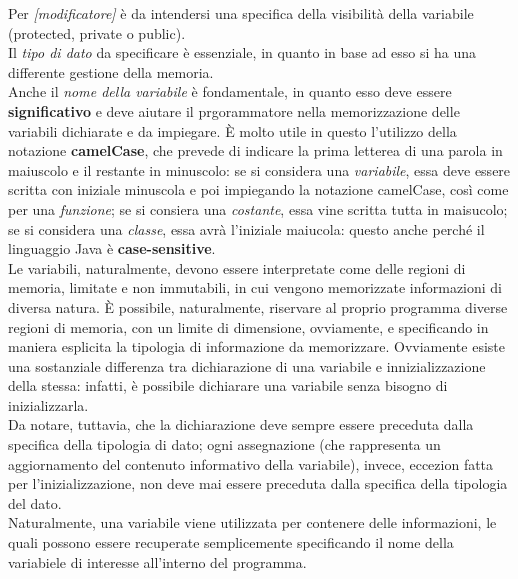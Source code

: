 \documentclass[a4paper]{extarticle}
\begin{document}
\noindent
Per \emph{[modificatore]} è da intendersi una specifica della visibilità della variabile (protected, private o public).\\
Il \emph{tipo di dato} da specificare è essenziale, in quanto in base ad esso si ha una differente gestione della memoria.\\
Anche il \emph{nome della variabile} è fondamentale, in quanto esso deve essere \textbf{significativo} e deve aiutare il prgorammatore nella memorizzazione delle variabili dichiarate e da impiegare. È molto utile in questo l'utilizzo della notazione \textbf{camelCase}, che prevede di indicare la prima letterea di una parola in maiuscolo e il restante in minuscolo:
se si considera una \emph{variabile}, essa deve essere scritta con iniziale minuscola e poi impiegando la notazione camelCase, così come per una \emph{funzione}; se si consiera una \emph{costante}, essa vine scritta tutta in maisucolo; se si considera una \emph{classe}, essa avrà l'iniziale maiucola: questo anche perché il linguaggio Java è \textbf{case-sensitive}.\\
Le variabili, naturalmente, devono essere interpretate come delle regioni di memoria, limitate e non immutabili, in cui vengono memorizzate informazioni di diversa natura. È possibile, naturalmente, riservare al proprio programma diverse regioni di memoria, con un limite di dimensione, ovviamente, e specificando in maniera esplicita la tipologia di informazione da memorizzare.
Ovviamente esiste una sostanziale differenza tra dichiarazione di una variabile e innizializzazione della stessa: infatti, è possibile dichiarare una variabile senza bisogno di inizializzarla.\\
Da notare, tuttavia, che la dichiarazione deve sempre essere preceduta dalla specifica della tipologia di dato; ogni assegnazione (che rappresenta un aggiornamento del contenuto informativo della variabile), invece, eccezion fatta per l'inizializzazione, non deve mai essere preceduta dalla specifica della tipologia del dato.\\
Naturalmente, una variabile viene utilizzata per contenere delle informazioni, le quali possono essere recuperate semplicemente specificando il nome della variabiele di interesse all'interno del programma.
\end{document}
